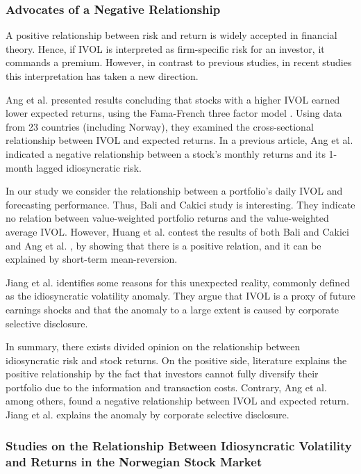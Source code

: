 \subsubsection{Advocates of a Negative Relationship}
A positive relationship between risk and return is widely accepted in financial theory. Hence, if IVOL is interpreted as firm-specific risk for an investor, it commands a premium. However, in contrast to previous studies, in recent studies this interpretation has taken a new direction.

Ang et al. \cite{angetal09} presented results concluding that stocks with a higher IVOL earned lower expected returns, using the Fama-French three factor model \cite{famafrench}. Using data from 23 countries (including Norway), they examined the cross-sectional relationship between IVOL and expected returns. In a previous article, Ang et al. \cite{angetal06} indicated a negative relationship between a stock's monthly returns and its 1-month lagged idiosyncratic risk. 

In our study we consider the relationship between a portfolio's daily IVOL and forecasting performance. Thus, Bali and Cakici \cite{balicakici06} study is interesting. They indicate no relation between value-weighted portfolio returns and the value-weighted average IVOL. However, Huang et al. \cite{huang} contest the results of both Bali and Cakici \cite{balicakici06} and Ang et al. \cite{angetal09}, by showing that there is a positive relation, and it can be explained by short-term mean-reversion.

Jiang et al. \cite{jiangetal} identifies some reasons for this unexpected reality, commonly defined as the idiosyncratic volatility anomaly. They argue that IVOL is a proxy of future earnings shocks and that the anomaly to a large extent is caused by corporate selective disclosure. 

In summary, there exists divided opinion on the relationship between idiosyncratic risk and stock returns. On the positive side, literature explains the positive relationship by the fact that investors cannot fully diversify their portfolio due to the information and transaction costs. Contrary, Ang et al. \cite{angetal06} among others, found a negative relationship between IVOL and expected return. Jiang et al. \cite{jiangetal} explains the anomaly by corporate selective disclosure.

\subsubsection{Studies on the Relationship Between Idiosyncratic Volatility and Returns in the Norwegian Stock Market}

